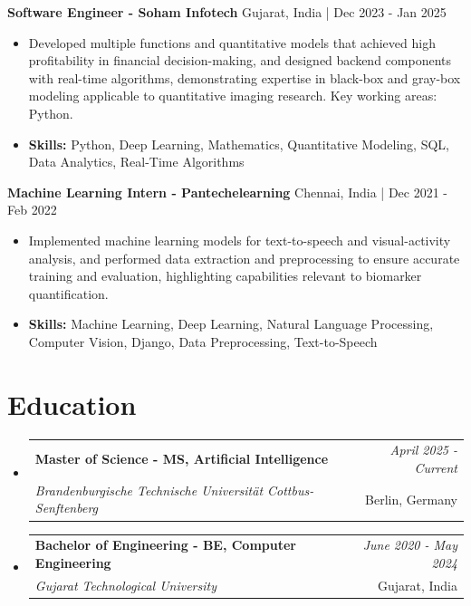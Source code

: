 \documentclass[a4paper,11pt]{article}
\makeatletter
\newcommand{\resumeSubheading}[4]{
\vspace{0.5mm}\item
    \begin{tabular*}{\linewidth}[t]{l@{\extracolsep{\fill}}r}
        \textbf{#1} & \textit{\footnotesize{#4}} \\
        \textit{\footnotesize{#3}} &  \footnotesize{#2}\\
    \end{tabular*}
    \vspace{-2.4mm}
}
\makeatother
\begin{document}
\vspace{1mm}
  \textbf{Software Engineer - Soham Infotech} \hfill Gujarat, India | Dec 2023 - Jan 2025
\vspace{-1.5mm} %
\begin{itemize}
  \item Developed multiple functions and quantitative models that achieved high profitability in financial decision-making, and designed backend components with real-time algorithms, demonstrating expertise in black-box and gray-box modeling applicable to quantitative imaging research. Key working areas: Python.

\vspace{-2mm}
  \item \textbf{Skills:} Python, Deep Learning, Mathematics, Quantitative Modeling, SQL, Data Analytics, Real-Time Algorithms
\end{itemize}

\vspace{1mm}
  \textbf{Machine Learning Intern - Pantechelearning} \hfill Chennai, India | Dec 2021 - Feb 2022
\vspace{-1.5mm} %
\begin{itemize}
  \item Implemented machine learning models for text-to-speech and visual-activity analysis, and performed data extraction and preprocessing to ensure accurate training and evaluation, highlighting capabilities relevant to biomarker quantification.
\vspace{-2mm}
  \item \textbf{Skills:} Machine Learning, Deep Learning, Natural Language Processing, Computer Vision, Django, Data Preprocessing, Text-to-Speech
\end{itemize}\section{\textbf{Education}}
\vspace{-0.4mm}

\begin{itemize}[leftmargin=0.15in, label={}]
\resumeSubheading
{Master of Science - MS, Artificial Intelligence }{Berlin, Germany}
{Brandenburgische Technische Universität Cottbus-Senftenberg  }{April 2025 - Current}

\vspace{1.0mm} %
\resumeSubheading
{Bachelor of Engineering - BE, Computer Engineering  }{Gujarat, India}
{Gujarat Technological University }{June 2020 - May 2024}

\end{itemize}
\end{document}
